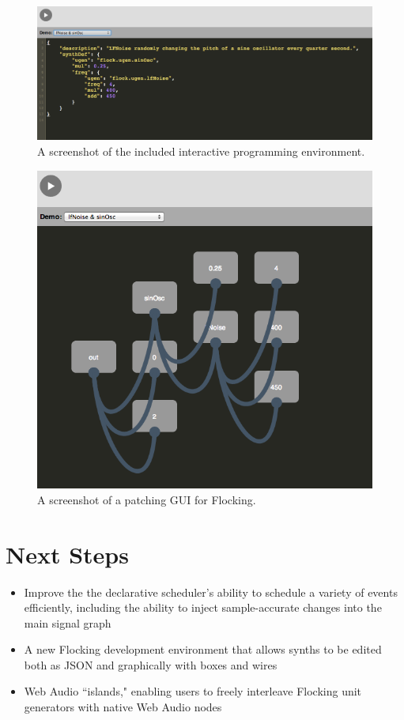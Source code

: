 \documentclass{article}
\begin{document}
\begin{figure}[h]
\centering
\includegraphics[width=0.9\columnwidth]{playground.png}
\caption{ A screenshot of the included interactive programming environment.\label{fig:playground}}
\end{figure}

\begin{figure}[h]
\centering
\includegraphics[width=0.9\columnwidth]{graphical.png}
\caption{ A screenshot of a patching GUI for Flocking.\label{fig:graphical}}
\end{figure}


\section{Next Steps}

\begin{itemize}
  \item Improve the the declarative scheduler's ability to schedule a variety of events efficiently, including the ability to inject sample-accurate changes into the main signal graph
  \item A new Flocking development environment that allows synths to be edited both as JSON and graphically with boxes and wires
  \item Web Audio ``islands," enabling users to freely interleave Flocking unit generators with native Web Audio nodes
\end{itemize}
\end{document}

